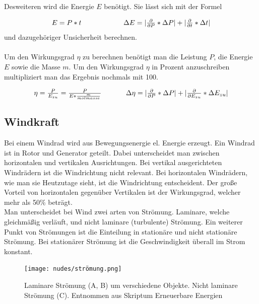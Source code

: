 \documentclass[12pt,a4paper,twoside]{article}
\begin{document}
\noindent
Desweiteren wird die Energie $E$ benötigt. Sie lässt sich mit der Formel

\begin{equation}
    \label{eq:energie}
    \centerline{$E = P*t$  \\ $\Delta E = \vert \frac{\partial }{\partial P} * \Delta P \vert + \vert \frac{\partial }{\partial t} * \Delta t \vert$}
\end{equation}
\noindent
und dazugehöriger Unsicherheit berechnen.
\\
\\
Um den Wirkungsgrad $\eta$ zu berechnen benötigt man die Leistung $P$, die Energie $E$ sowie die Masse $m$. Um den Wirkungsgrad $\eta$ in Prozent anzuschreiben multipliziert man das Ergebnis nochmals mit 100.  

\begin{equation}
    \label{eq:wirkungsgrad}
    \centerline{$\eta  = \frac{P}{E_{zu}} = \frac{P}{E*\frac{m}{molmasse}}$  \\ $\Delta \eta = \vert \frac{\partial }{\partial P} * \Delta P \vert + \vert \frac{\partial }{\partial E_{zu}} * \Delta E_{zu} \vert$}
\end{equation}


\subsection{Windkraft}
Bei einem Windrad wird aus Bewegungsenergie el. Energie erzeugt. Ein Windrad ist in Rotor und Generator geteilt. Dabei unterscheidet man zwischen horizontalen und vertikalen Ausrichtungen. Bei vertikal ausgerichteten Windrädern ist die Windrichtung nicht relevant. Bei horizontalen Windrädern, wie man sie Heutzutage sieht, ist die Windrichtung entscheident. Der große Vorteil von horizontalen gegenüber Vertikalen ist der Wirkungsgrad, welcher mehr als 50\% beträgt. 
\\
Man unterscheidet bei Wind zwei arten von Strömung. Laminare, welche gleichmäßig verläuft, und nicht laminare (turbulente) Strömung. 
Ein weiterer Punkt von Strömungen ist die Einteilung in stationäre und nicht stationäre Strömung. Bei stationärer Strömung ist die Geschwindigkeit überall im Strom konstant. 

\begin{figure}[H]
    \centering
    \texttt{[image: nudes/strömung.png]}
    \caption{Laminare Strömung (A, B) um verschiedene Objekte. Nicht laminare Strömung (C). Entnommen aus Skriptum Erneuerbare Energien \cite{teachcenter2}}
    \label{fig:strömung}
\end{figure}
\end{document}
